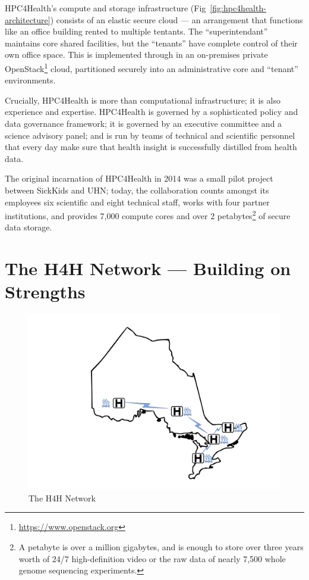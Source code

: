 \documentclass[twoside,symmetric,sfsidenotes,notoc]{tufte-book}
\begin{document}
HPC4Health's compute and storage infrastructure (Fig~\ref{fig:hpc4health-architecture})
consists of an elastic secure cloud --- an arrangement that functions like an office building
rented to multiple tentants.  The ``superintendant'' maintains core shared facilities, but
the ``tenants'' have complete control of their own office space.   This is implemented through
in an on-premises private OpenStack\footnote{\url{https://www.openstack.org}} cloud,
partitioned securely into an administrative core and ``tenant'' environments.

Crucially, HPC4Health is more than computational infrastructure;  it is also
experience and expertise.  HPC4Health is governed by a sophisticated
policy and data governance framework; it is governed by an executive committee
and a science advisory panel; and is run by teams of technical and scientific
personnel that every day make sure that health insight is successfully distilled from
health data.

The original incarnation of HPC4Health in 2014 was a small pilot project between
SickKids and UHN; today, the collaboration counts amongst its employees six scientific 
and eight technical staff, works with four partner institutions, and provides 7,000
compute cores and over 2 petabytes\footnote{A petabyte is over a million gigabytes,
and is enough to store over three years worth of 24/7 high-definition video or the
raw data of nearly 7,500 whole genome sequencing experiments.} of secure data storage.



\chapter{The H4H Network --- Building on Strengths}
\label{ch:hpc4health_network}

\begin{figure}
  \includegraphics{H4HNetwork.pdf}
  \caption[The H4H Network]{The H4H Network}
  \label{fig:hpc4health_network}
\end{figure}




\backmatter





\printindex
\end{document}
